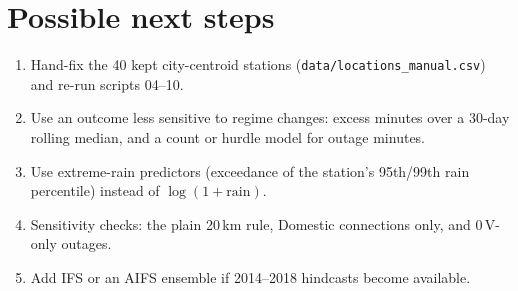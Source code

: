 \documentclass[11pt,a4paper]{article}
\newcommand{\code}[1]{\texttt{\small #1}}
\begin{document}
\section{Possible next steps}
\begin{enumerate}
\item Hand-fix the 40 kept city-centroid stations (\code{data/locations\_manual.csv}) and re-run scripts
04--10.
\item Use an outcome less sensitive to regime changes: excess minutes over a 30-day rolling median, and a
count or hurdle model for outage minutes.
\item Use extreme-rain predictors (exceedance of the station's 95th/99th rain percentile) instead of
$\log(1+\text{rain})$.
\item Sensitivity checks: the plain 20\,km rule, Domestic connections only, and 0\,V-only outages.
\item Add IFS or an AIFS ensemble if 2014--2018 hindcasts become available.
\end{enumerate}

\appendix
\end{document}
